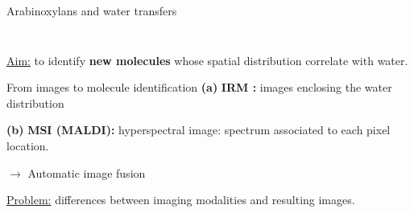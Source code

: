 \documentclass[10pt]{beamer}
\begin{document}
\begin{frame}{Arabinoxylans and water transfers}
\begin{columns}[totalwidth=\textwidth]
\begin{column}[c]{0.5\linewidth}
\begin{figure}[ht]
\begin{subfigure}[t]{0.45\textwidth}
          \label{subfig:water_transfer}
        \end{subfigure}%
      \end{figure}
    \end{column}
  \end{columns}
  

     \underline{Aim:} to identify \textbf{new molecules} whose spatial distribution correlate with water.\\

   \end{frame}


\begin{frame}{From images to molecule identification}
  \textbf{(a)} \textbf{IRM :} images enclosing the water distribution
   \vspace{0.1cm}

  \textbf{(b)} \textbf{MSI (MALDI):} hyperspectral image: spectrum associated to each pixel location.

  $\rightarrow$ Automatic image \alert{fusion}

  \underline{Problem:} differences between imaging modalities and resulting images.


\end{frame}
\end{document}
